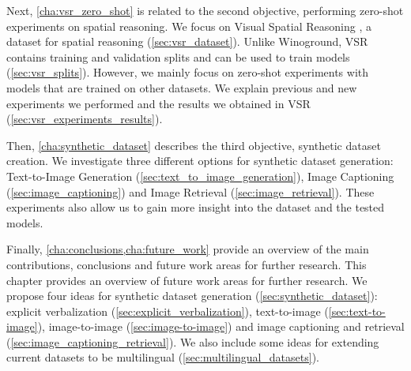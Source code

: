 Next, \cref{cha:vsr_zero_shot} is related to the second objective, performing zero-shot experiments on spatial reasoning. We focus on Visual Spatial Reasoning \cite{liu2022visual}, a dataset for spatial reasoning (\cref{sec:vsr_dataset}). Unlike Winoground, VSR contains training and validation splits and can be used to train models (\cref{sec:vsr_splits}). However, we mainly focus on zero-shot experiments with models that are trained on other datasets. We explain previous and new experiments we performed and the results we obtained in VSR (\cref{sec:vsr_experiments_results}).

Then, \cref{cha:synthetic_dataset} describes the third objective, synthetic dataset creation. We investigate three different options for synthetic dataset generation: Text-to-Image Generation (\ref{sec:text_to_image_generation}), Image Captioning (\ref{sec:image_captioning}) and Image Retrieval (\ref{sec:image_retrieval}). These experiments also allow us to gain more insight into the dataset and the tested models.

Finally, \cref{cha:conclusions,cha:future_work} provide an overview of the main contributions, conclusions and future work areas for further research. This chapter provides an overview of future work areas for further research. We propose four ideas for synthetic dataset generation (\cref{sec:synthetic_dataset}): explicit verbalization (\ref{sec:explicit_verbalization}), text-to-image (\ref{sec:text-to-image}), image-to-image (\ref{sec:image-to-image}) and image captioning and retrieval (\ref{sec:image_captioning_retrieval}). We also include some ideas for extending current datasets to be multilingual (\cref{sec:multilingual_datasets}).